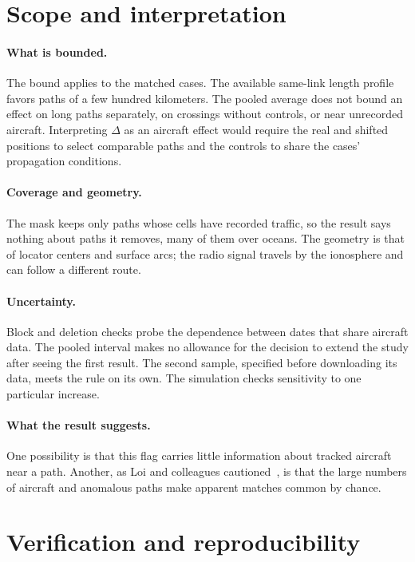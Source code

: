 \documentclass[11pt]{article}
\begin{document}
\section{Scope and interpretation}\label{sec:limits}

\paragraph{What is bounded.} The bound applies to the matched cases. The available same-link length profile favors paths of a few hundred kilometers. The pooled average does not bound an effect on long paths separately, on crossings without controls, or near unrecorded aircraft. Interpreting $\Delta$ as an aircraft effect would require the real and shifted positions to select comparable paths and the controls to share the cases' propagation conditions.

\paragraph{Coverage and geometry.} The mask keeps only paths whose cells have recorded traffic, so the result says nothing about paths it removes, many of them over oceans. The geometry is that of locator centers and surface arcs; the radio signal travels by the ionosphere and can follow a different route.

\paragraph{Uncertainty.} Block and deletion checks probe the dependence between dates that share aircraft data. The pooled interval makes no allowance for the decision to extend the study after seeing the first result. The second sample, specified before downloading its data, meets the rule on its own. The simulation checks sensitivity to one particular increase.

\paragraph{What the result suggests.} One possibility is that this flag carries little information about tracked aircraft near a path. Another, as Loi and colleagues cautioned~\cite{loi}, is that the large numbers of aircraft and anomalous paths make apparent matches common by chance.

\section{Verification and reproducibility}\label{sec:verify}
\end{document}
